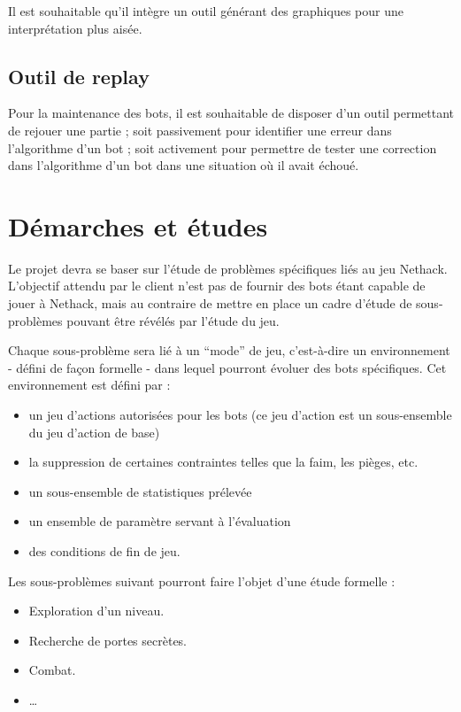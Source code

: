 \documentclass[12pt]{article}
\begin{document}
Il est souhaitable qu'il intègre un outil générant des graphiques pour une interprétation plus aisée.

\subsection{Outil de replay}

Pour la maintenance des bots, il est souhaitable de disposer d'un outil permettant de rejouer une partie ; soit passivement pour identifier une erreur dans l'algorithme d'un bot ; soit activement pour permettre de tester une correction dans l'algorithme d'un bot dans une situation où il avait échoué.

\section{Démarches et études}

Le projet devra se baser sur l'étude de problèmes spécifiques liés au jeu Nethack. L'objectif attendu par le client n'est pas de fournir des bots étant capable de jouer à Nethack, mais au contraire de mettre en place un cadre d'étude de sous-problèmes pouvant être révélés par l'étude du jeu.

Chaque sous-problème sera lié à un ``mode'' de jeu, c'est-à-dire un environnement - défini de façon formelle - dans lequel pourront évoluer des bots spécifiques. Cet environnement est défini par : 
\begin{itemize}
	\item un jeu d'actions autorisées pour les bots (ce jeu d'action est un sous-ensemble du jeu d'action de base) 
	\item la suppression de certaines contraintes telles que la faim, les pièges, etc. 
	\item un sous-ensemble de statistiques prélevée 
	\item un ensemble de paramètre servant à l'évaluation 
	\item des conditions de fin de jeu.
\end{itemize}

Les sous-problèmes suivant pourront faire l'objet d'une étude formelle : 
\begin{itemize}
	\item Exploration d'un niveau.
	\item Recherche de portes secrètes.
	\item Combat.
	\item \ldots
\end{itemize}
\end{document}
